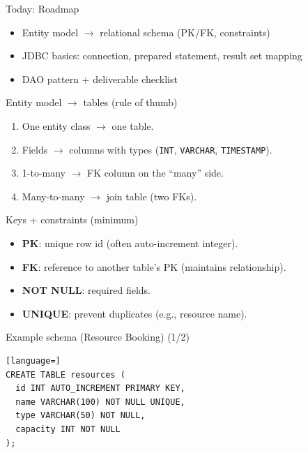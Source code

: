 \documentclass{beamer}
\begin{document}
\begin{frame}{Today: Roadmap}
  \begin{itemize}[<+->]
    \item Entity model $\rightarrow$ relational schema (PK/FK, constraints)
    \item JDBC basics: connection, prepared statement, result set mapping
    \item DAO pattern + deliverable checklist
  \end{itemize}
  \slidesources{\OOPSUnitVISources}
\end{frame}

\begin{frame}{Entity model $\rightarrow$ tables (rule of thumb)}
  \begin{enumerate}[<+->]
    \item One entity class $\rightarrow$ one table.
    \item Fields $\rightarrow$ columns with types (\texttt{INT}, \texttt{VARCHAR}, \texttt{TIMESTAMP}).
    \item 1-to-many $\rightarrow$ FK column on the ``many'' side.
    \item Many-to-many $\rightarrow$ join table (two FKs).
  \end{enumerate}
  \slidesources{\OOPSUnitVISources}
\end{frame}

\begin{frame}{Keys + constraints (minimum)}
  \begin{itemize}[<+->]
    \item \textbf{PK}: unique row id (often auto-increment integer).
    \item \textbf{FK}: reference to another table's PK (maintains relationship).
    \item \textbf{NOT NULL}: required fields.
    \item \textbf{UNIQUE}: prevent duplicates (e.g., resource name).
  \end{itemize}
  \slidesources{\OOPSUnitVISources}
\end{frame}

\begin{frame}[fragile]{Example schema (Resource Booking) (1/2)}
\begin{lstlisting}[language=]
CREATE TABLE resources (
  id INT AUTO_INCREMENT PRIMARY KEY,
  name VARCHAR(100) NOT NULL UNIQUE,
  type VARCHAR(50) NOT NULL,
  capacity INT NOT NULL
);
\end{lstlisting}
  \slidesources{\OOPSUnitVISources}
\end{frame}
\end{document}
